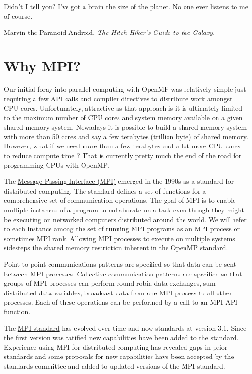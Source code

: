 
\epigraph{Didn’t I tell you? I’ve got a brain the size of the planet. No one ever listens to me of course.}{Marvin the Paranoid Android, \emph{The Hitch-Hiker's Guide to the Galaxy}.}

\minitoc



\section{Why MPI?}

Our initial foray into parallel computing with OpenMP was relatively simple just requiring a few API calls and compiler directives to distribute work amongst CPU cores. Unfortunately, attractive as that approach is it is ultimately limited to the maximum number of CPU cores and system memory available on a given shared memory system. Nowadays it is possible to build a shared memory system with more than 50 cores and say a few terabytes (trillion byte) of shared memory. However, what if we need more than a few terabytes and a lot more CPU cores to reduce compute time ? That is currently pretty much the end of the road for programming CPUs with OpenMP.

The \href{https://en.wikipedia.org/wiki/Message_Passing_Interface}{Message Passing Interface (MPI)} emerged in the 1990s as a standard for distributed computing. The standard defines a set of functions for a comprehensive set of communication operations. The goal of MPI is to enable multiple instances of a program to collaborate on a task even though they might be executing on networked computers distributed around the world.  We will refer to each instance among the set of running MPI programs as an MPI process or sometimes MPI rank. Allowing MPI processes to execute on multiple systems sidesteps the shared memory restriction inherent in the OpenMP standard.

Point-to-point communications patterns are specified so that data can be sent between MPI processes. Collective communication patterns are specified so that groups of MPI processes  can perform round-robin data exchanges, sum distributed data variables, broadcast data from one MPI process to all other processes. Each of these operations can be performed by a call to an MPI API function.

The \href{https://www.mpi-forum.org/docs/}{MPI standard} has evolved over time and now standards at version 3.1. Since the first version was ratified new capabilities have been added to the standard. Experience using MPI for distributed computing has revealed gaps in prior standards and some proposals for new capabilities have been accepted by the standards committee and added to updated versions of the MPI standard.

